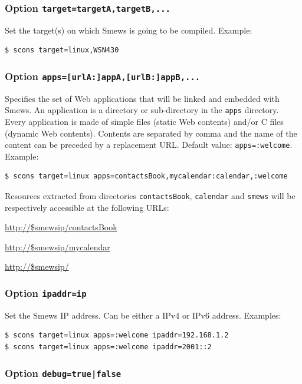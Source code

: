 \documentclass{report}
\begin{document}
\subsubsection{Option {\tt target=targetA,targetB,...}}

Set the target(s) on which Smews is going to be compiled. Example:
\begin{verbatim}
$ scons target=linux,WSN430
\end{verbatim}

\subsubsection{Option {\tt apps=[urlA:]appA,[urlB:]appB,...}}

Specifies the set of Web applications that will be linked and embedded with Smews. An application is a directory or sub-directory in the \verb+apps+ directory. Every application is made of simple files (static Web contents) and/or C files (dynamic Web contents). Contents are separated by comma and the name of the content can be preceded by a replacement URL. Default value: \verb+apps=:welcome+. Example:
\begin{verbatim}
$ scons target=linux apps=contactsBook,mycalendar:calendar,:welcome
\end{verbatim}

Resources extracted from directories \verb+contactsBook+, \verb+calendar+ and \verb+smews+ will be respectively accessible at the following URLs:

\url{http://$smewsip/contactsBook}

\url{http://$smewsip/mycalendar}

\url{http://$smewsip/}

\subsubsection{Option {\tt ipaddr=ip}}

Set the Smews IP address. Can be either a IPv4 or IPv6 address. Examples:
\begin{verbatim}
$ scons target=linux apps=:welcome ipaddr=192.168.1.2
$ scons target=linux apps=:welcome ipaddr=2001::2
\end{verbatim}

\subsubsection{Option {\tt debug=true|false}}
\end{document}
